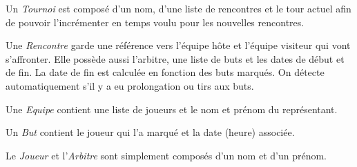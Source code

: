 \documentclass[10pt]{report}
\begin{document}
	\begin{figure}[here]
	      \begin{center}	      
	      \end{center}
	\end{figure}

Un \textit{Tournoi} est composé d'un nom, d'une liste de rencontres et le tour actuel afin de pouvoir l'incrémenter en temps voulu pour les nouvelles rencontres.

Une \textit{Rencontre} garde une référence vers l'équipe hôte et l'équipe visiteur qui vont s'affronter.
Elle possède aussi l'arbitre, une liste de buts et les dates de début et de fin.
La date de fin est calculée en fonction des buts marqués. On détecte automatiquement s'il y a eu prolongation ou tirs aux buts.

Une \textit{Equipe} contient une liste de joueurs et le nom et prénom du représentant.

Un \textit{But} contient  le joueur qui l'a marqué et la date (heure) associée.
 
Le \textit{Joueur} et l'\textit{Arbitre} sont simplement composés d'un nom et d'un prénom.



\newpage
\end{document}
